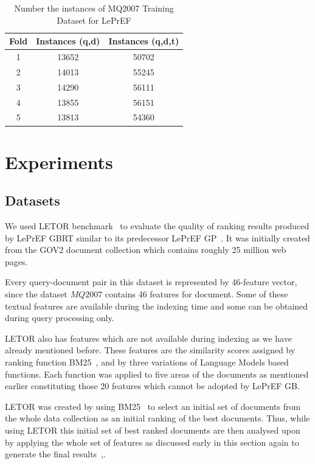 \documentclass[preprint,12pt,3p]{elsarticle}
\begin{document}
\begin{table}[h!]
 \centering
 \begin{tabular}{||c c c||} 
 \hline
 Fold & Instances (q,d) & Instances (q,d,t) \\ [0.5ex] 
 \hline\hline
 1 & 13652 & 50702\\ 
 \hline
 2 & 14013 & 55245\\
 \hline
 3 & 14290 & 56111\\
 \hline
 4 & 13855 & 56151\\
 \hline
 5 & 13813 & 54360\\ 
 \hline
\end{tabular}
\caption{Number the instances of MQ2007 Training Dataset for LePrEF}
\label{fig:letor}
\end{table}

\section{Experiments}
\label{experiments}

\subsection{Datasets}
\label{sec:datasets}
We used LETOR benchmark~\cite{liu2007letor} to evaluate the quality of ranking results produced by LePrEF GBRT similar to its predecessor LePrEF GP~\cite{costa2012lepref}. It was initially created from the GOV2 document collection which contains roughly 25 million web pages. 

Every query-document pair in this dataset is represented by 46-feature vector, since the dataset $MQ2007$ contains 46 features for document. Some of these textual features are available during the indexing time and some can be obtained during query processing only. 

LETOR also has features which are not available during indexing as we have already mentioned before. These features are the similarity scores assigned by ranking function BM25~\cite{robertson1994some}, and by three variations of Language Models based functions. Each function was applied to five areas of the documents as mentioned earlier constituting those 20 features which cannot be adopted by LePrEF GB.

LETOR was created by using BM25~\cite{robertson1994some} to select an initial set of documents from the whole data collection as an initial ranking of the best documents. Thus, while using LETOR this initial set of best ranked documents are then analysed upon by applying the whole set of features as discussed early in this section again to generate the final results~\cite{dang2013two},\cite{cambazoglu2010early}.
\end{document}
